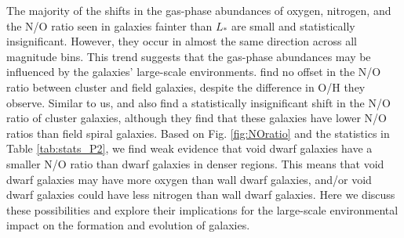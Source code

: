 The majority of the shifts in the gas-phase abundances of oxygen, nitrogen, and 
the N/O ratio seen in galaxies fainter than $L_*$ are small and statistically 
insignificant.  However, they occur in almost the same direction across all 
magnitude bins.  This trend suggests that the gas-phase abundances may be 
influenced by the galaxies' large-scale environments.  \cite{Shields91} find no 
offset in the N/O ratio between cluster and field galaxies, despite the 
difference in O/H they observe.  Similar to us, \cite{Contini02} and 
\cite{Pilyugin02} also find a statistically insignificant shift in the N/O ratio 
of cluster galaxies, although they find that these galaxies have lower N/O 
ratios than field spiral galaxies.  Based on Fig. \ref{fig:NOratio} and the 
statistics in Table \ref{tab:stats_P2}, we find weak evidence that void dwarf 
galaxies have a smaller N/O ratio than dwarf galaxies in denser regions.  This 
means that void dwarf galaxies may have more oxygen than wall dwarf galaxies, 
and/or void dwarf galaxies could have less nitrogen than wall dwarf galaxies.  
Here we discuss these possibilities and explore their implications for the 
large-scale environmental impact on the formation and evolution of galaxies.

%

